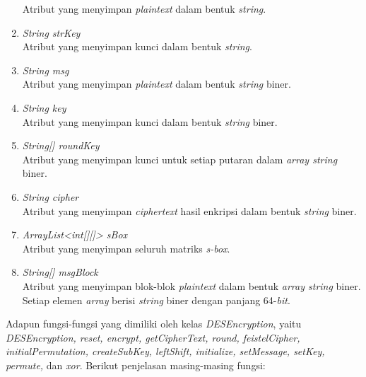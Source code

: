 \begin{enumerate}
	Atribut yang menyimpan \textit{plaintext} dalam bentuk \textit{string}.
	\item \textit{String strKey} \\
	Atribut yang menyimpan kunci dalam bentuk \textit{string}.
	\item \textit{String msg} \\
	Atribut yang menyimpan \textit{plaintext} dalam bentuk \textit{string} biner.
	\item \textit{String key} \\
	Atribut yang menyimpan kunci dalam bentuk \textit{string} biner.
	\item \textit{String[] roundKey} \\
	Atribut yang menyimpan kunci untuk setiap putaran dalam \textit{array string} biner.
	\item \textit{String cipher} \\
	Atribut yang menyimpan \textit{ciphertext} hasil enkripsi dalam bentuk \textit{string} biner.
	\item \textit{ArrayList<int[][]> sBox} \\
	Atribut yang menyimpan seluruh matriks \textit{s-box}.
	\item \textit{String[] msgBlock} \\
	Atribut yang menyimpan blok-blok \textit{plaintext} dalam bentuk \textit{array string} biner. Setiap elemen \textit{array} berisi \textit{string} biner dengan panjang 64-\textit{bit}.
\end{enumerate}

Adapun fungsi-fungsi yang dimiliki oleh kelas \textit{DESEncryption}, yaitu \textit{DESEncryption, reset, encrypt, getCipherText, round, feistelCipher, initialPermutation, createSubKey, leftShift, initialize, setMessage, setKey, permute,} dan \textit{xor}. Berikut penjelasan masing-masing fungsi:

